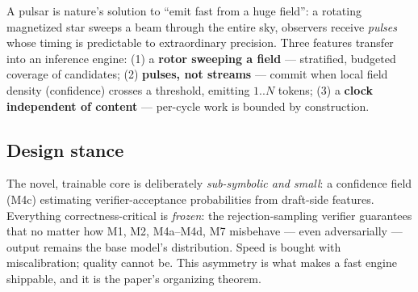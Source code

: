 \documentclass[11pt,a4paper]{article}
\theoremstyle{definition}
\begin{document}
A pulsar is nature's solution to ``emit fast from a huge field'': a rotating
magnetized star sweeps a beam through the entire sky, observers receive
\emph{pulses} whose timing is predictable to extraordinary precision. Three
features transfer into an inference engine: (1) a \textbf{rotor sweeping a
field} --- stratified, budgeted coverage of candidates; (2) \textbf{pulses,
not streams} --- commit when local field density (confidence) crosses a
threshold, emitting $1..N$ tokens; (3) a \textbf{clock independent of
content} --- per-cycle work is bounded by construction.

\subsection{Design stance}
The novel, trainable core is deliberately \emph{sub-symbolic and small}: a
confidence field (M4c) estimating verifier-acceptance probabilities from
draft-side features. Everything correctness-critical is \emph{frozen}: the
rejection-sampling verifier guarantees that no matter how M1, M2, M4a--M4d,
M7 misbehave --- even adversarially --- output remains the base model's
distribution. Speed is bought with miscalibration; quality cannot be. This
asymmetry is what makes a fast engine shippable, and it is the paper's
organizing theorem.
\end{document}
